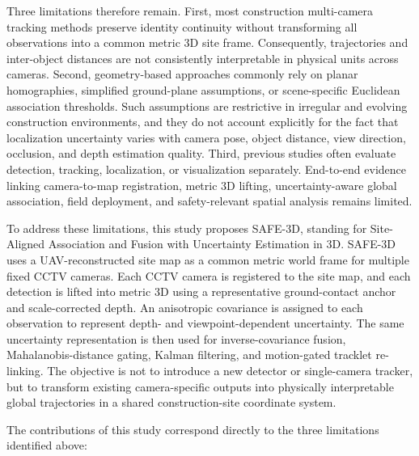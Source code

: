 Three limitations therefore remain. First, most construction multi-camera tracking methods preserve identity continuity without transforming all observations into a common metric 3D site frame. Consequently, trajectories and inter-object distances are not consistently interpretable in physical units across cameras. Second, geometry-based approaches commonly rely on planar homographies, simplified ground-plane assumptions, or scene-specific Euclidean association thresholds. Such assumptions are restrictive in irregular and evolving construction environments, and they do not account explicitly for the fact that localization uncertainty varies with camera pose, object distance, view direction, occlusion, and depth estimation quality. Third, previous studies often evaluate detection, tracking, localization, or visualization separately. End-to-end evidence linking camera-to-map registration, metric 3D lifting, uncertainty-aware global association, field deployment, and safety-relevant spatial analysis remains limited.

To address these limitations, this study proposes SAFE-3D, standing for Site-Aligned Association and Fusion with Uncertainty Estimation in 3D. SAFE-3D uses a UAV-reconstructed site map as a common metric world frame for multiple fixed CCTV cameras. Each CCTV camera is registered to the site map, and each detection is lifted into metric 3D using a representative ground-contact anchor and scale-corrected depth. An anisotropic covariance is assigned to each observation to represent depth- and viewpoint-dependent uncertainty. The same uncertainty representation is then used for inverse-covariance fusion, Mahalanobis-distance gating, Kalman filtering, and motion-gated tracklet re-linking. The objective is not to introduce a new detector or single-camera tracker, but to transform existing camera-specific outputs into physically interpretable global trajectories in a shared construction-site coordinate system.

The contributions of this study correspond directly to the three limitations identified above:

